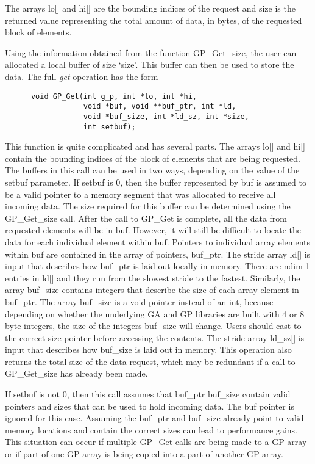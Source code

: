 \noindent
The arrays lo[] and hi[] are the bounding indices of the request and size is the
returned value representing the total amount of data, in bytes, of the requested
block of elements.

Using the information obtained from the function GP\_Get\_size, the user can
allocated a local buffer of size `size'. This buffer can then be used to store
the data. The full \emph{get} operation has the form

\begin{verbatim}
      void GP_Get(int g_p, int *lo, int *hi,
                  void *buf, void **buf_ptr, int *ld,
                  void *buf_size, int *ld_sz, int *size,
                  int setbuf);
\end{verbatim}

\noindent
This function is quite complicated and has several parts. The arrays lo[] and hi[]
contain the bounding indices of the block of elements that are being requested.
The buffers in this call can be used in two ways, depending on the value of the
setbuf parameter. If setbuf is 0, then the buffer represented by buf is assumed
to be a valid pointer to a memory segment that was allocated to receive all
incoming data. The size required for this buffer can be determined using the
GP\_Get\_size call. After the call
to GP\_Get is complete, all the data from requested elements will be in buf.
However, it will still be difficult to locate the data for each
individual element within buf. Pointers to individual array elements within buf
are contained in the array of pointers, buf\_ptr. The stride array ld[] is input
that describes how buf\_ptr is laid out locally in memory. There are ndim-1
entries in ld[] and they run from the slowest stride to the fastest.  Similarly,
the array buf\_size
contains integers that describe the size of each array element in buf\_ptr. The
array buf\_size is a void pointer instead of an int, because depending on
whether the underlying GA and GP libraries are built with 4 or 8 byte integers,
the size of the integers buf\_size will change. Users should cast to the correct
size pointer before accessing the contents. The stride array ld\_sz[] is input
that describes how buf\_size is laid out in memory.  This operation also returns
the total size of the data request, which may be redundant if a call to
GP\_Get\_size has already been made.

If setbuf is not 0, then this call assumes that buf\_ptr buf\_size contain valid
pointers and sizes that can be used to hold incoming data. The buf pointer is
ignored for this case. Assuming the buf\_ptr and buf\_size already point to
valid memory locations and contain the correct sizes can lead to performance
gains. This situation can occur if multiple GP\_Get calls are being made to a GP
array or if part of one GP array is being copied into a part of another GP
array.

